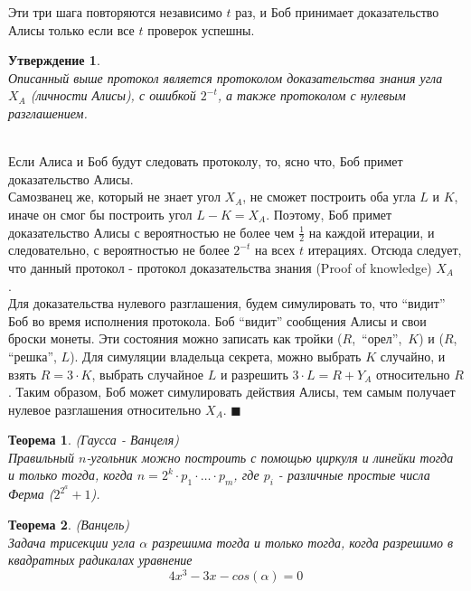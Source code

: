 \documentclass{report}%
\newtheorem{theorem}{Теорема}
\newtheorem{claim}{Утверждение}
\newenvironment{proof}{\par\noindent{\bf Доказательство.}}{\hfill$\scriptstyle\blacksquare$}
\begin{document}
\noindent Эти три шага повторяются независимо $t$ раз, и Боб принимает доказательство Алисы
только если все $t$ проверок успешны.

\begin{claim}~\\
	Описанный выше протокол является протоколом доказательства знания угла $X_A$ (личности Алисы),
	с ошибкой $2^{-t}$, а также протоколом с нулевым разглашением.
\end{claim}

\begin{proof}~\\
	Если Алиса и Боб будут следовать протоколу, то, ясно что, Боб примет доказательство Алисы.~\\
	Самозванец же, который не знает угол $X_A$, не сможет построить оба угла $L$ и $K$, иначе
	он смог бы построить угол $L - K = X_A$. Поэтому, Боб примет доказательство Алисы с вероятностью
	не более чем $\frac{1}{2}$ на каждой итерации, и следовательно, с вероятностью не более
	$2^{-t}$ на всех $t$ итерациях. Отсюда следует, что данный протокол - протокол доказательства
	знания (Proof of knowledge) $X_A$ \cite{interact}.~\\
	Для доказательства нулевого разглашения, будем симулировать то, что ``видит'' Боб во
	время исполнения протокола. Боб ``видит'' сообщения Алисы и свои броски монеты. Эти состояния
	можно записать как тройки ($R$,~``орел'',~$K$) и ($R$, ``решка'', $L$). Для симуляции владельца
	секрета, можно выбрать $K$ случайно, и взять $R = 3 \cdot K$, выбрать случайное $L$ и разрешить
	$3 \cdot L = R + Y_A$ относительно $R$. Таким образом, Боб может симулировать действия Алисы,
	тем самым получает нулевое разглашения относительно $X_A$.
\end{proof}

\begin{theorem}(Гаусса - Ванцеля)~\\
	Правильный $n$-угольник можно построить с помощью циркуля и линейки тогда и только тогда, когда
	$n = 2^k \cdot p_1 \cdot \ldots \cdot p_m$, где $p_i$ - различные простые числа Ферма ($2^{2^a} + 1$).
\end{theorem}

\begin{theorem}(Ванцель)~\\
	Задача трисекции угла $\alpha$ разрешима тогда и только тогда, когда
	разрешимо в квадратных радикалах уравнение
	$$
		4x^3  - 3x  - cos(\alpha) = 0
	$$
\end{theorem}
\end{document}
